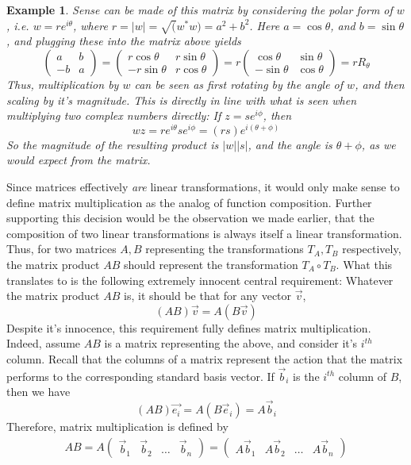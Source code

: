 \documentclass{article}
\theoremstyle{definition}
\theoremstyle{plain}
\newtheorem{example}{Example}[section]
\theoremstyle{theorem}
\begin{document}
\begin{example}
Sense can be made of this matrix by considering the polar form of $w$, i.e. $w = re^{i\theta}$, where $r = |w| = \sqrt(w^*w) = a^2+b^2$. Here $a = \cos\theta$, and $b = \sin\theta$, and plugging these into the matrix above yields
	\[ \begin{pmatrix} a & b \\ -b & a \end{pmatrix} = \begin{pmatrix} r\cos\theta & r\sin\theta \\ -r\sin\theta & r\cos\theta \end{pmatrix} = r\begin{pmatrix} \cos\theta & \sin\theta \\ -\sin\theta & \cos\theta \end{pmatrix} = rR_{\theta} \]
Thus, multiplication by $w$ can be seen as first rotating by the angle of $w$, and then scaling by it's magnitude. This is directly in line with what is seen when multiplying two complex numbers directly: If $z = se^{i\phi}$, then 
\[ wz = re^{i\theta}se^{i\phi} = (rs)e^{i(\theta+\phi)} \]
So the magnitude of the resulting product is $|w||s|$, and the angle is $\theta + \phi$, as we would expect from the matrix. 
\end{example}
\par Since matrices effectively \textit{are} linear transformations, it would only make sense to define matrix multiplication as the analog of function composition. Further supporting this decision would be the observation we made earlier, that the composition of two linear transformations is always itself a linear transformation. Thus, for two matrices $A,B$ representing the transformations $T_A,T_B$ respectively, the matrix product $AB$ should represent the transformation $T_A \circ T_B$. What this translates to is the following extremely innocent central requirement: Whatever the matrix product $AB$ is, it should be that for any vector $\vec{v}$,
\[ (AB)\vec{v} = A(B\vec{v}) \]
Despite it's innocence, this requirement fully defines matrix multiplication. Indeed, assume $AB$ is a matrix representing the above, and consider it's $i^{th}$ column. Recall that the columns of a matrix represent the action that the matrix performs to the corresponding standard basis vector. If $\vec{b}_i$ is the $i^{th}$ column of $B$, then we have 
\[ (AB)\vec{e_i} = A(B\vec{e}_i) = A\vec{b}_i \]
Therefore, matrix multiplication is defined by
\begin{align}
	AB = A\begin{pmatrix} \vec{b}_1 & \vec{b}_2 & \ldots & \vec{b}_n \end{pmatrix} = \begin{pmatrix} A\vec{b}_1 & A\vec{b}_2 & \ldots & A\vec{b}_n \end{pmatrix}
\end{align}  
\end{document}
